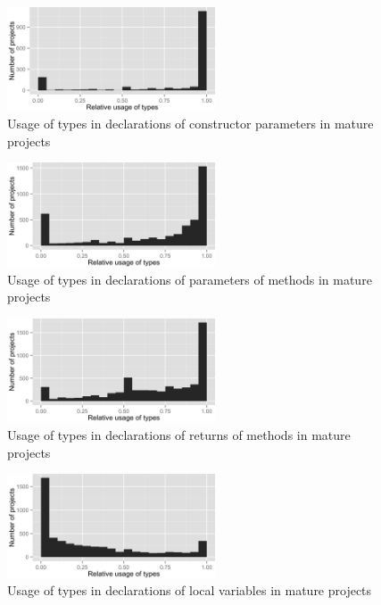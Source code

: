 \begin{figure}[h]
\centering 
\includegraphics[width=0.55\textwidth]{../aosd_2014/analysis/result/script/class/histograms/9_Constructor_Parameter.png} 
\caption{Usage of types in declarations of constructor parameters in mature projects}
\end{figure}

\begin{figure}[h]
\centering 
\includegraphics[width=0.55\textwidth]{../aosd_2014/analysis/result/script/class/histograms/8_Method_Parameter.png} 
\caption{Usage of types in declarations of parameters of methods in mature projects}
\end{figure}

\begin{figure}[h]
\centering 
\includegraphics[width=0.55\textwidth]{../aosd_2014/analysis/result/script/class/histograms/7_Method_Return.png} 
\caption{Usage of types in declarations of returns of methods in mature projects}
\end{figure}

\begin{figure}[h]
\centering 
\includegraphics[width=0.55\textwidth]{../aosd_2014/analysis/result/script/class/histograms/6_Local_Variable.png} 
\caption{Usage of types in declarations of local variables in mature projects}
\end{figure}

